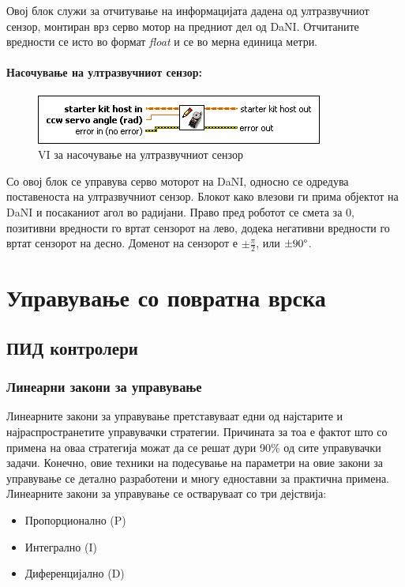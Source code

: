 \documentclass{article}
\begin{document}
Овој блок служи за отчитување на информацијата дадена од ултразвучниот сензор, монтиран врз серво мотор на предниот дел од DaNI. Отчитаните вредности се исто во формат \textit{float} и се во мерна единица метри.

\paragraph{Насочување на ултразвучниот сензор:\\}
\begin{figure}[H]
\includegraphics[width=0.45\linewidth]{./images/write_servo.png}
\caption{VI за насочување на ултразвучниот сензор}
\label{fig:write_servo.png}
\raggedright
\end{figure}
Со овој блок се управува серво моторот на DaNI, односно се одредува поставеноста на ултразвучниот сензор. Блокот како влезови ги прима објектот на DaNI и посаканиот агол во радијани. Право пред роботот се смета за 0, позитивни вредности го вртат сензорот на лево, додека негативни вредности го вртат сензорот на десно. Доменот на сензорот е $ \pm \frac{\pi}{2}$, или $\pm 90 \degree$.

\newpage
\section{Управување со повратна врска}
\subsection{ПИД контролери}
\subsubsection{Линеарни закони за управување}
Линеарните закони за управување претставуваат едни од најстарите и најраспространетите управувачки стратегии. Причината за тоа е фактот што со примена на оваа стратегија можат да се решат дури 90\% од сите управувачки задачи. Конечно, овие техники на подесување на параметри на овие закони за управување се детално разработени и многу едноставни за практична примена.\\
Линеарните закони за управување се остваруваат со три дејствија:
\begin{itemize}
	\item Пропорционално (P)
	\item Интегрално (I)
	\item Диференцијално (D)
\end{itemize}
\end{document}
